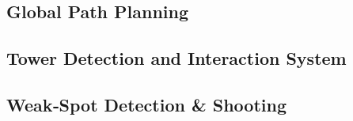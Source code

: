 \subsection{Global Path Planning}\label{sec:planner}


\subsection{Tower Detection and Interaction System}\label{sec:orbit}


\subsection{Weak‑Spot Detection \& Shooting}\label{sec:shooter}
 